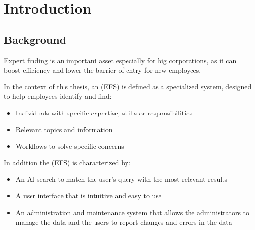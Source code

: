 \newpage
\section{Introduction}

\subsection{Background}
Expert finding is an important asset especially for big corporations, as it can boost efficiency and lower the barrier of 
entry for new employees.

In the context of this thesis, an (\ac{EFS}) is defined as a specialized system, designed to help employees identify and find:

\begin{itemize}
    \item Individuals with specific expertise, skills or responsibilities
    \item Relevant topics and information
    \item Workflows to solve specific concerns
\end{itemize}

In addition the (\ac{EFS}) is characterized by:

\begin{itemize}
    \item An AI search to match the user’s query with the most relevant results
    \item A user interface that is intuitive and easy to use
    \item An administration and maintenance system that allows the administrators to manage the data and the users to report changes and errors in the data
\end{itemize}



